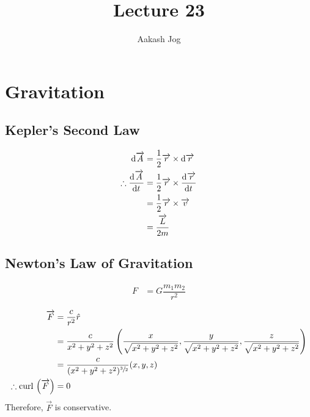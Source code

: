 \documentclass[fleqn, a4paper, 12pt]{article}
\title{Lecture 23}
\author{Aakash Jog}
\date{\formatdate{15}{1}{2015}}
\theoremstyle{definition}
\theoremstyle{theorem}
\newcommand{\curl}{\mathrm{curl\,}}
\begin{document}
\maketitle

\tableofcontents

\newpage
\section{Gravitation}

\subsection{Kepler's Second Law}


\begin{align*}
	\dif \overrightarrow{A} &= \dfrac{1}{2} \overrightarrow{r} \times \dif \overrightarrow{r}\\
	\therefore \dod{\overrightarrow{A}}{t} &= \dfrac{1}{2} \overrightarrow{r} \times \dod{\overrightarrow{r}}{t}\\
	&= \dfrac{1}{2} \overrightarrow{r} \times \overrightarrow{v}\\
	&= \dfrac{\overrightarrow{L}}{2m}
\end{align*}

\subsection{Newton's Law of Gravitation}

\begin{align*}
	F &= G \dfrac{m_1 m_2}{r^2}
\end{align*}

\begin{align*}
	\overrightarrow{F} &= \dfrac{c}{r^2} \hat{r}\\
	&= \dfrac{c}{x^2 + y^2 + z^2} \left( \dfrac{x}{\sqrt{x^2 + y^2 + z^2}}, \dfrac{y}{\sqrt{x^2 + y^2 + z^2}}, \dfrac{z}{\sqrt{x^2 + y^2 + z^2}} \right)\\
	&= \dfrac{c}{(x^2 + y^2 + z^2)^{\sfrac{3}{2}}} (x,y,z)\\
	\therefore \curl \left( \overrightarrow{F} \right) &= 0
\end{align*}
Therefore, $\overrightarrow{F}$ is conservative.
\end{document}
